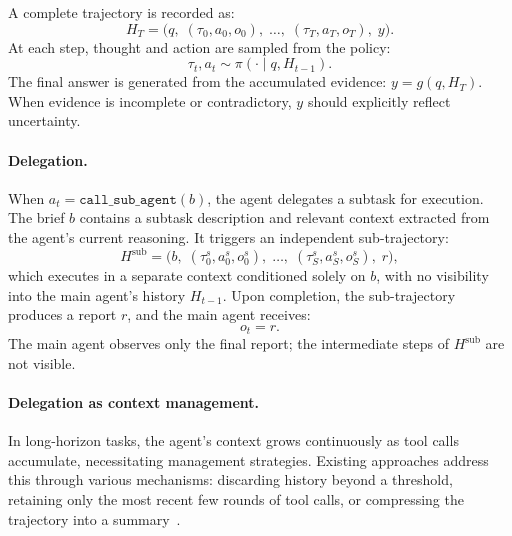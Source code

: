\documentclass[table]{gtech}
\begin{document}
A complete trajectory is recorded as:
\begin{equation}
H_T = \bigl(q,\; (\tau_0, a_0, o_0),\; \ldots,\; (\tau_T, a_T, o_T),\; y\bigr).
\end{equation}
At each step, thought and action are sampled from the policy:
\begin{equation}
\tau_t, a_t \sim \pi(\cdot \mid q, H_{t-1}).
\end{equation}
The final answer is generated from the accumulated evidence: $y = g(q, H_T)$. When evidence is incomplete or contradictory, $y$ should explicitly reflect uncertainty.

\paragraph{Delegation.}
When $a_t = \texttt{call\_sub\_agent}(b)$, the agent delegates a subtask for execution. The brief $b$ contains a subtask description and relevant context extracted from the agent's current reasoning. It triggers an independent sub-trajectory:
\begin{equation}
H^{\text{sub}} = \bigl(b,\; (\tau_0^s, a_0^s, o_0^s),\; \ldots,\; (\tau_S^s, a_S^s, o_S^s),\; r\bigr),
\end{equation}
which executes in a separate context conditioned solely on $b$, with no visibility into the main agent's history $H_{t-1}$. Upon completion, the sub-trajectory produces a report $r$, and the main agent receives:
\begin{equation}
o_t = r.
\end{equation}
The main agent observes only the final report; the intermediate steps of $H^{\text{sub}}$ are not visible.

\paragraph{Delegation as context management.}
In long-horizon tasks, the agent's context grows continuously as tool calls accumulate, necessitating management strategies. Existing approaches address this through various mechanisms: discarding history beyond a threshold, retaining only the most recent few rounds of tool calls, or compressing the trajectory into a summary~\citep{liu2025deepseek, zeng2026glm, team2026mirothinker}.
\end{document}
